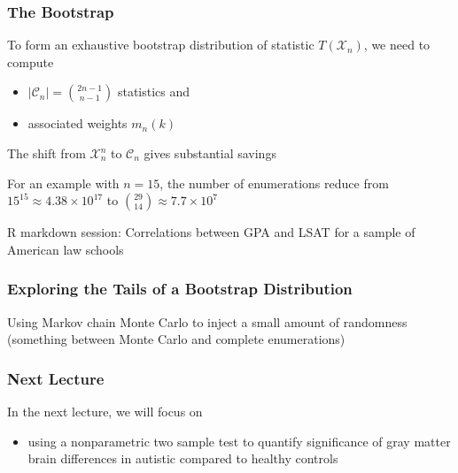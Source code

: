 \documentclass[10pt]{beamer}
\begin{document}
\begin{frame}
\frametitle{The Bootstrap}

To form an exhaustive bootstrap distribution of statistic $T(\mathcal{X}_n)$, \newline
we need to compute  
\begin{itemize}
\item $|\mathcal{C}_n| = \binom{2n-1 }{n-1}$ statistics and 
\item associated weights $m_n(k)$
\end{itemize}

\vspace{0.3cm}
The shift from $\mathcal{X}_n^n$ to $\mathcal{C}_n$ gives substantial savings \newline

For an example with $n = 15$, the number of enumerations reduce from $15^{15} \approx 4.38 \times 10^{17}$ to $\binom{29}{14} \approx 7.7 \times 10^7$ \newline

\alert{R markdown session:} Correlations between GPA and LSAT for a sample of American law schools

\end{frame}

\begin{frame}
\frametitle{Exploring the Tails of a Bootstrap Distribution}

Using Markov chain Monte Carlo to inject a small amount of randomness (something between Monte Carlo and complete enumerations) \newline

\end{frame}

\begin{frame}
\frametitle{Next Lecture}

In the next lecture, we will focus on
\begin{itemize}
\item using a nonparametric two sample test to quantify significance of gray matter brain differences in autistic compared to healthy controls
\end{itemize}

\end{frame}

\end{document}
